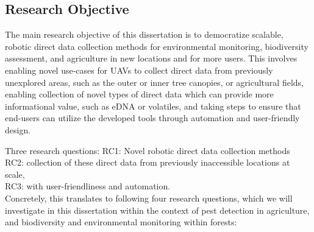 \subsection{Research Objective}



The main research objective of this dissertation is to democratize scalable, robotic direct data collection methods for environmental monitoring, biodiversity assessment, and agriculture in new locations and for more users. This involves enabling novel use-cases for UAVs to collect direct data from previously unexplored areas, such as the outer or inner tree canopies, or agricultural fields, enabling collection of novel types of direct data which can provide more informational value, such as eDNA or volatiles, and taking steps to ensure that end-users can utilize the developed tools through automation and user-friendly design. 

Three research questions:  RC1: Novel robotic direct data collection methods \\%

RC2: collection of these direct data from previously inaccessible locations at scale, \\%

RC3: with user-friendliness and automation. \\%

Concretely, this translates to following four research questions, which we will investigate in this dissertation within the context of pest detection in agriculture, and biodiversity and environmental monitoring within forests:\\

